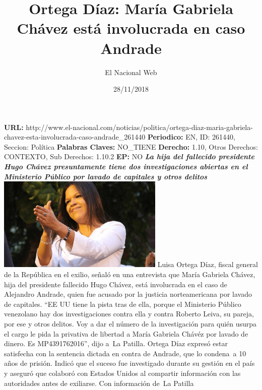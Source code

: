 \documentclass{article}%
\title{\textbf{Ortega Díaz: María Gabriela Chávez está involucrada en caso Andrade}}%
\author{El Nacional Web}%
\date{28/11/2018}%
\begin{document}
%
\normalsize%
\maketitle%
\textbf{URL: }%
http://www.el{-}nacional.com/noticias/politica/ortega{-}diaz{-}maria{-}gabriela{-}chavez{-}esta{-}involucrada{-}caso{-}andrade\_261440\newline%
%
\textbf{Periodico: }%
EN, %
ID: %
261440, %
Seccion: %
Política\newline%
%
\textbf{Palabras Claves: }%
NO\_TIENE\newline%
%
\textbf{Derecho: }%
1.10, %
Otros Derechos: %
CONTEXTO, %
Sub Derechos: %
1.10.2\newline%
%
\textbf{EP: }%
NO\newline%
\newline%
%
\textbf{\textit{La hija del fallecido presidente Hugo Chávez presuntamente tiene dos investigaciones abiertas en el Ministerio Público por lavado de capitales y otros delitos}}%
\newline%
\newline%
%
\includegraphics[width=300px]{182.jpg}%
\newline%
%
Luisa Ortega Díaz, fiscal general de la República en el exilio, señaló en una entrevista que María Gabriela Chávez, hija del presidente fallecido Hugo Chávez, está involucrada en el caso de Alejandro Andrade, quien fue acusado por la justicia norteamericana por lavado de capitales.%
\newline%
%
“EE UU tiene la pista tras de ella, porque el Ministerio Público venezolano hay dos investigaciones contra ella y contra Roberto Leiva, su pareja, por ese y otros delitos. Voy a dar el número de la investigación para quién usurpa el cargo le pida la privativa de libertad a María Gabriela Chávéz por lavado de dinero. Es MP4391762016”, dijo a~La Patilla.%
\newline%
%
Ortega Díaz expresó estar satisfecha con la sentencia dictada en contra de Andrade, que lo condena~a 10 años de prisión.%
\newline%
%
Indicó que el suceso fue investigado durante su gestión en el país y aseguró que colaboró con Estados Unidos al compartir información con las autoridades antes de exiliarse.%
\newline%
%
Con información de~La Patilla%
\newline%
%
\end{document}
